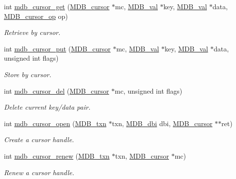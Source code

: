 \begin{DoxyCompactItemize}
int \mbox{\hyperlink{group__internal_ga9a89df677df185c758470ee67111bd38}{mdb\+\_\+cursor\+\_\+get}} (\mbox{\hyperlink{struct_m_d_b__cursor}{M\+D\+B\+\_\+cursor}} $\ast$mc, \mbox{\hyperlink{struct_m_d_b__val}{M\+D\+B\+\_\+val}} $\ast$key, \mbox{\hyperlink{struct_m_d_b__val}{M\+D\+B\+\_\+val}} $\ast$data, \mbox{\hyperlink{group__mdb_ga1206b2af8b95e7f6b0ef6b28708c9127}{M\+D\+B\+\_\+cursor\+\_\+op}} op)
\begin{DoxyCompactList}\small\item\em Retrieve by cursor. \end{DoxyCompactList}\item 
int \mbox{\hyperlink{group__internal_gaf13a73e97adab038c58aed44066b782e}{mdb\+\_\+cursor\+\_\+put}} (\mbox{\hyperlink{struct_m_d_b__cursor}{M\+D\+B\+\_\+cursor}} $\ast$mc, \mbox{\hyperlink{struct_m_d_b__val}{M\+D\+B\+\_\+val}} $\ast$key, \mbox{\hyperlink{struct_m_d_b__val}{M\+D\+B\+\_\+val}} $\ast$data, unsigned int flags)
\begin{DoxyCompactList}\small\item\em Store by cursor. \end{DoxyCompactList}\item 
int \mbox{\hyperlink{group__internal_gaec9d5e29f4cc470e383b6b9f46d9239d}{mdb\+\_\+cursor\+\_\+del}} (\mbox{\hyperlink{struct_m_d_b__cursor}{M\+D\+B\+\_\+cursor}} $\ast$mc, unsigned int flags)
\begin{DoxyCompactList}\small\item\em Delete current key/data pair. \end{DoxyCompactList}\item 
int \mbox{\hyperlink{group__internal_ga6f7ad479fa949270fe28659202c6aa0c}{mdb\+\_\+cursor\+\_\+open}} (\mbox{\hyperlink{struct_m_d_b__txn}{M\+D\+B\+\_\+txn}} $\ast$txn, \mbox{\hyperlink{group__mdb_gadbe68a06c448dfb62da16443d251a78b}{M\+D\+B\+\_\+dbi}} dbi, \mbox{\hyperlink{struct_m_d_b__cursor}{M\+D\+B\+\_\+cursor}} $\ast$$\ast$ret)
\begin{DoxyCompactList}\small\item\em Create a cursor handle. \end{DoxyCompactList}\item 
int \mbox{\hyperlink{group__internal_ga64f8dec3653d3d4226c87b820265e7e5}{mdb\+\_\+cursor\+\_\+renew}} (\mbox{\hyperlink{struct_m_d_b__txn}{M\+D\+B\+\_\+txn}} $\ast$txn, \mbox{\hyperlink{struct_m_d_b__cursor}{M\+D\+B\+\_\+cursor}} $\ast$mc)
\begin{DoxyCompactList}\small\item\em Renew a cursor handle. \end{DoxyCompactList}\item 
$$
\end{DoxyCompactItemize}
